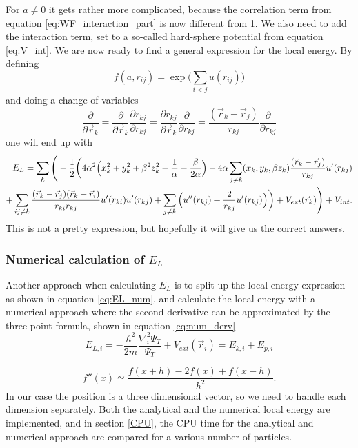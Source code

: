 \documentclass[norsk,a4paper,12pt]{article}
\begin{document}
For $a\neq0$ it gets rather more complicated, because the correlation term from equation \ref{eq:WF_interaction_part} is now different from 1. We also need to add the interaction term, set to a so-called hard-sphere potential from equation \ref{eq:V_int}. We are now ready to find a general expression for the local energy. By defining
\begin{equation}
f(a, r_{ij})=\exp{\bigg(\sum_{i<j}u(r_{ij})\bigg)}
\end{equation}
and doing a change of variables
\begin{equation}
\frac{\partial}{\partial \vec{r}_k}=\frac{\partial}{\partial \vec{r}_k}\frac{\partial r_{kj}}{\partial r_{kj}}=\frac{\partial r_{kj}}{\partial \vec{r}_k}\frac{\partial}{\partial r_{kj}}=\frac{(\vec{r}_k-\vec{r}_j)}{r_{kj}}\frac{\partial}{\partial r_{kj}}
\end{equation}
one will end up with
\begin{align}
E_L=\sum_k\Bigg(-\frac{1}{2}\bigg(4\alpha^2\Big(x_k^2+y_k^2+\beta^2z_k^2-\frac{1}{\alpha}-\frac{\beta}{2\alpha}\Big)
-4\alpha\sum_{j\neq k}(x_k, y_k, \beta z_k)\frac{(\vec{r}_k-\vec{r}_j)}{r_{kj}}u'(r_{kj})\notag\\
+\sum_{ij\neq k}\frac{(\vec{r}_k-\vec{r}_j)(\vec{r}_k-\vec{r}_i)}{r_{ki}r_{kj}}u'(r_{ki})u'(r_{kj})
+\sum_{j\neq k}\Big(u''(r_{kj})+\frac{2}{r_{kj}}u'(r_{kj})\Big)\bigg)+V_{ext}(\vec{r}_k)\Bigg) + V_{int}.\notag
\label{EL_total}
\end{align}
This is not a pretty expression, but hopefully it will give us the correct answers. 



\subsubsection{Numerical calculation of $E_L$} \label{Numerical_calc_E_L}

Another approach when calculating $E_L$ is to split up the local energy expression as shown in equation \ref{eq:EL_num}, and calculate the local energy with a numerical approach where the second derivative can be approximated by the three-point formula, shown in equation \ref{eq:num_derv}
\begin{equation}
\label{eq:EL_num}
E_{L,i}=-\frac{\hbar^2}{2m}\frac{\nabla_i^2\Psi_T}{\Psi_T}+V_{ext}(\vec{r}_i)=E_{k,i}+E_{p,i}
\end{equation}

\begin{equation}
\label{eq:num_derv}
f''(x)\simeq\frac{f(x+h)-2f(x)+f(x-h)}{h^2}.
\end{equation}
In our case the position is a three dimensional vector, so we need to handle each dimension separately. Both the analytical and the numerical local energy are implemented, and in section \ref{CPU}, the CPU time for the analytical and numerical approach are compared for a various number of particles. 
\end{document}
